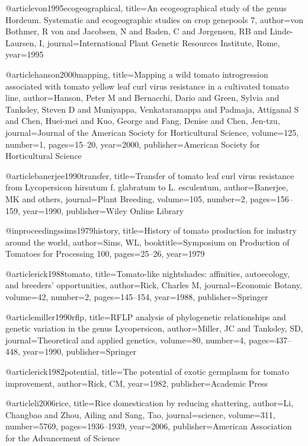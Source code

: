 @article{von1995ecogeographical,
  title={An ecogeographical study of the genus Hordeum. Systematic and ecogeographic studies on crop genepools 7},
  author={von Bothmer, R von and Jacobsen, N and Baden, C and J{\o}rgensen, RB and Linde-Laursen, I},
  journal={International Plant Genetic Resources Institute, Rome},
  year={1995}
}

@article{hanson2000mapping,
  title={Mapping a wild tomato introgression associated with tomato yellow leaf curl virus resistance in a cultivated tomato line},
  author={Hanson, Peter M and Bernacchi, Dario and Green, Sylvia and Tanksley, Steven D and Muniyappa, Venkataramappa and Padmaja, Attiganal S and Chen, Huei-mei and Kuo, George and Fang, Denise and Chen, Jen-tzu},
  journal={Journal of the American Society for Horticultural Science},
  volume={125},
  number={1},
  pages={15--20},
  year={2000},
  publisher={American Society for Horticultural Science}
}

@article{banerjee1990transfer,
  title={Transfer of tomato leaf curl virus resistance from Lycopersicon hirsutum f. glabratum to L. esculentum},
  author={Banerjee, MK and others},
  journal={Plant Breeding},
  volume={105},
  number={2},
  pages={156--159},
  year={1990},
  publisher={Wiley Online Library}
}

@inproceedings{sims1979history,
  title={History of tomato production for industry around the world},
  author={Sims, WL},
  booktitle={Symposium on Production of Tomatoes for Processing 100},
  pages={25--26},
  year={1979}
}

@article{rick1988tomato,
  title={Tomato-like nightshades: affinities, autoecology, and breeders’ opportunities},
  author={Rick, Charles M},
  journal={Economic Botany},
  volume={42},
  number={2},
  pages={145--154},
  year={1988},
  publisher={Springer}
}

@article{miller1990rflp,
  title={RFLP analysis of phylogenetic relationships and genetic variation in the genus Lycopersicon},
  author={Miller, JC and Tanksley, SD},
  journal={Theoretical and applied genetics},
  volume={80},
  number={4},
  pages={437--448},
  year={1990},
  publisher={Springer}
}

@article{rick1982potential,
  title={The potential of exotic germplasm for tomato improvement},
  author={Rick, CM},
  year={1982},
  publisher={Academic Press}
}

@article{li2006rice,
  title={Rice domestication by reducing shattering},
  author={Li, Changbao and Zhou, Ailing and Sang, Tao},
  journal={science},
  volume={311},
  number={5769},
  pages={1936--1939},
  year={2006},
  publisher={American Association for the Advancement of Science}
}

